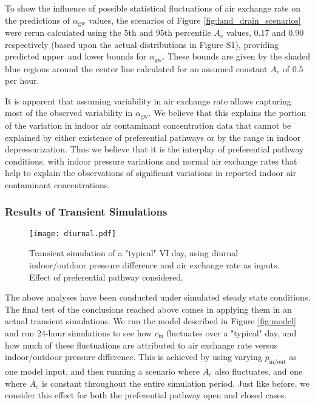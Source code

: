 \documentclass[journal=esthag,manuscript=article]{achemso}
\begin{document}
To show the influence of possible statistical fluctuations of air exchange rate on the predictions of $\alpha_\mathrm{gw}$ values, the scenarios of Figure \ref{fig:land_drain_scenarios} were rerun calculated using the 5th and 95th percentile $A_e$ values, 0.17 and 0.90 respectively (based upon the actual distributions in Figure S1), providing predicted upper and lower bounds for $\alpha_\mathrm{gw}$.
These bounds are given by the shaded blue regions around the center line calculated for an assumed constant $A_e$ of 0.5 per hour.\par

It is apparent that assuming variability in air exchange rate allows capturing most of the observed variability in $\alpha_\mathrm{gw}$.
We believe that this explains the portion of the variation in indoor air contaminant concentration data that cannot be explained by either existence of preferential pathways or by the range in indoor depressurization.
Thus we believe that it is the interplay of preferential pathway conditions, with indoor pressure variations and normal air exchange rates that help to explain the observations of significant variations in reported indoor air contaminant concentrations.\par

\subsubsection{Results of Transient Simulations}

\begin{figure}
 \caption{Transient simulation of a "typical" VI day, using diurnal indoor/outdoor pressure difference and air exchange rate as inputs. Effect of preferential pathway considered.}\label{fig:diurnal}
 \texttt{[image: diurnal.pdf]}
\end{figure}

The above analyses have been conducted under simulated steady state conditions.
The final test of the conclusions reached above comes in applying them in an actual transient simulations.
We run the model described in Figure \ref{fig:model} and run 24-hour simulations to see how $c_\mathrm{in}$ fluctuates over a "typical" day, and how much of these fluctuations are attributed to air exchange rate versus indoor/outdoor pressure difference.
This is achieved by using varying $p_\mathrm{in/out}$ as one model input, and then running a scenario where $A_e$ also fluctuates, and one where $A_e$ is constant throughout the entire simulation period.
Just like before, we consider this effect for both the preferential pathway open and closed cases.\par
\end{document}
